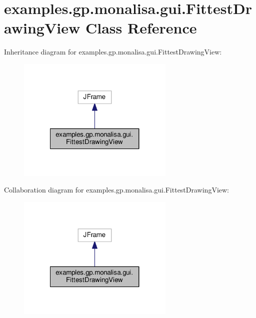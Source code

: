 \hypertarget{classexamples_1_1gp_1_1monalisa_1_1gui_1_1_fittest_drawing_view}{\section{examples.\-gp.\-monalisa.\-gui.\-Fittest\-Drawing\-View Class Reference}
\label{classexamples_1_1gp_1_1monalisa_1_1gui_1_1_fittest_drawing_view}
}


Inheritance diagram for examples.\-gp.\-monalisa.\-gui.\-Fittest\-Drawing\-View\-:
\nopagebreak
\begin{figure}[H]
\begin{center}
\leavevmode
\includegraphics[width=212pt]{classexamples_1_1gp_1_1monalisa_1_1gui_1_1_fittest_drawing_view__inherit__graph}
\end{center}
\end{figure}


Collaboration diagram for examples.\-gp.\-monalisa.\-gui.\-Fittest\-Drawing\-View\-:
\nopagebreak
\begin{figure}[H]
\begin{center}
\leavevmode
\includegraphics[width=212pt]{classexamples_1_1gp_1_1monalisa_1_1gui_1_1_fittest_drawing_view__coll__graph}
\end{center}
\end{figure}
